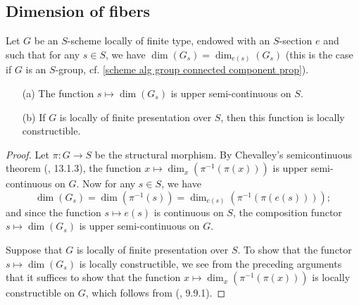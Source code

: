 \subsection{Dimension of fibers}
\begin{proposition}\label{scheme group local ft fiber dimension functor semicontinuous}
Let $G$ be an $S$-scheme locally of finite type, endowed with an $S$-section $e$ and such that for any $s\in S$, we have $\dim(G_s)=\dim_{e(s)}(G_s)$ (this is the case if $G$ is an $S$-group, cf. \cref{scheme alg group connected component prop}).
\begin{enumerate}
    \item[(a)] The function $s\mapsto\dim(G_s)$ is upper semi-continuous on $S$.
    \item[(b)] If $G$ is locally of finite presentation over $S$, then this function is locally constructible.
\end{enumerate}
\end{proposition}
\begin{proof}
Let $\pi:G\to S$ be the structural morphism. By Chevalley's semicontinuous theorem (\cite{EGA4-3}, 13.1.3), the function $x\mapsto\dim_x(\pi^{-1}(\pi(x)))$ is upper semi-continuous on $G$. Now for any $s\in S$, we have
\[\dim(G_s)=\dim(\pi^{-1}(s))=\dim_{e(s)}(\pi^{-1}(\pi(e(s))));\]
and since the function $s\mapsto e(s)$ is continuous on $S$, the composition functor $s\mapsto\dim(G_s)$ is upper semi-continuous on $G$.\par
Suppose that $G$ is locally of finite presentation over $S$. To show that the functor $s\mapsto\dim(G_s)$ is locally constructible, we see from the preceding arguments that it suffices to show that the function $x\mapsto\dim_x(\pi^{-1}(\pi(x)))$ is locally constructible on $G$, which follows from (\cite{EGA4-3}, 9.9.1).
\end{proof}


